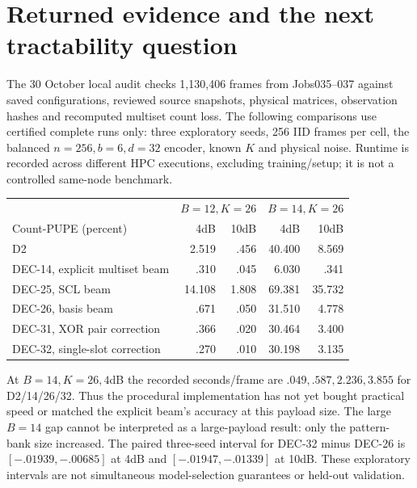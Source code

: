 \documentclass[10pt,a4paper]{article}
\begin{document}
\section{Returned evidence and the next tractability question}
The 30 October local audit checks 1,130,406 frames from Jobs035--037 against saved configurations,
reviewed source snapshots, physical matrices, observation hashes and recomputed multiset count loss.
The following comparisons use certified complete runs only: three exploratory seeds, 256 IID frames
per cell, the balanced $n=256,b=6,d=32$ encoder, known $K$ and physical noise. Runtime is recorded
across different HPC executions, excluding training/setup; it is not a controlled same-node benchmark.

\begin{center}\small
\begin{tabular}{@{}lrrrr@{}}\toprule
 & \multicolumn{2}{c}{$B=12,K=26$} & \multicolumn{2}{c}{$B=14,K=26$}\\
Count-PUPE (percent) & 4dB & 10dB & 4dB & 10dB\\\midrule
D2 & 2.519 & .456 & 40.400 & 8.569\\
DEC-14, explicit multiset beam & .310 & .045 & 6.030 & .341\\
DEC-25, SCL beam & 14.108 & 1.808 & 69.381 & 35.732\\
DEC-26, basis beam & .671 & .050 & 31.510 & 4.778\\
DEC-31, XOR pair correction & .366 & .020 & 30.464 & 3.400\\
DEC-32, single-slot correction & .270 & .010 & 30.198 & 3.135\\\bottomrule
\end{tabular}
\end{center}
At $B=14,K=26,4$dB the recorded seconds/frame are $.049,.587,2.236,3.855$ for
D2/14/26/32. Thus the procedural implementation has not yet bought practical speed or matched the
explicit beam's accuracy at this payload size. The large $B=14$ gap cannot be interpreted as a
large-payload result: only the pattern-bank size increased. The paired three-seed interval for
DEC-32 minus DEC-26 is $[-.01939,-.00685]$ at 4dB and $[-.01947,-.01339]$ at 10dB. These exploratory intervals
are not simultaneous model-selection guarantees or held-out validation.
\end{document}
